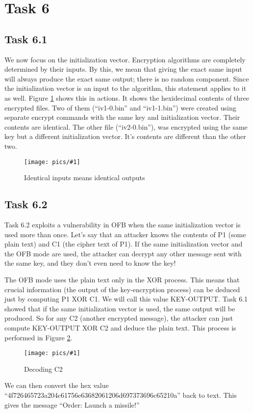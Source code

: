 \documentclass[11pt]{article}
\newcommand{\fig}[2]{ 
\begin{figure}[h]
	\centering
	\caption{#2}
	\texttt{[image: pics/\#1]}
	\label{fig:#1}
\end{figure} 
}
\begin{document}
\newpage
\section*{Task 6}

\subsection*{Task 6.1}

We now focus on the initialization vector. Encryption algorithms are completely determined by their inputs. By this, we mean that giving the exact same input will always produce the exact same output; there is no random component. Since the initialization vector is an input to the algorithm, this statement applies to it as well. Figure \ref{fig:task6.1.1} shows this in actions. It shows the hexidecimal contents of three encrypted files. Two of them (``iv1-0.bin'' and ``iv1-1.bin'') were created using separate encrypt commands with the same key and initialization vector. Their contents are identical. The other file (``iv2-0.bin''), was encrypted using the same key but a different initialization vector. It's contents are different than the other two.

\fig{task6.1.1}{Identical inputs means identical outputs}

\subsection*{Task 6.2}

Task 6.2 exploits a vulnerability in OFB when the same initialization vector is used more than once. Let's say that an attacker knows the contents of P1 (some plain text) and C1 (the cipher text of P1). If the same initialization vector and the OFB mode are used, the attacker can decrypt any other message sent with the same key, and they don't even need to know the key!

The OFB mode uses the plain text only in the XOR process. This means that crucial information (the output of the key-encryption process) can be deduced just by computing P1 XOR C1. We will call this value KEY-OUTPUT. Task 6.1 showed that if the same initialization vector is used, the same output will be produced. So for any C2 (another encrypted message), the attacker can just compute KEY-OUTPUT XOR C2 and deduce the plain text. This process is performed in Figure \ref{fig:task6.2.1}.

\fig{task6.2.1}{Decoding C2}

We can then convert the hex value ``4f726465723a204c61756e63682061206d697373696c65210a'' back to text. This gives the message ``Order: Launch a missile!''
\end{document}
